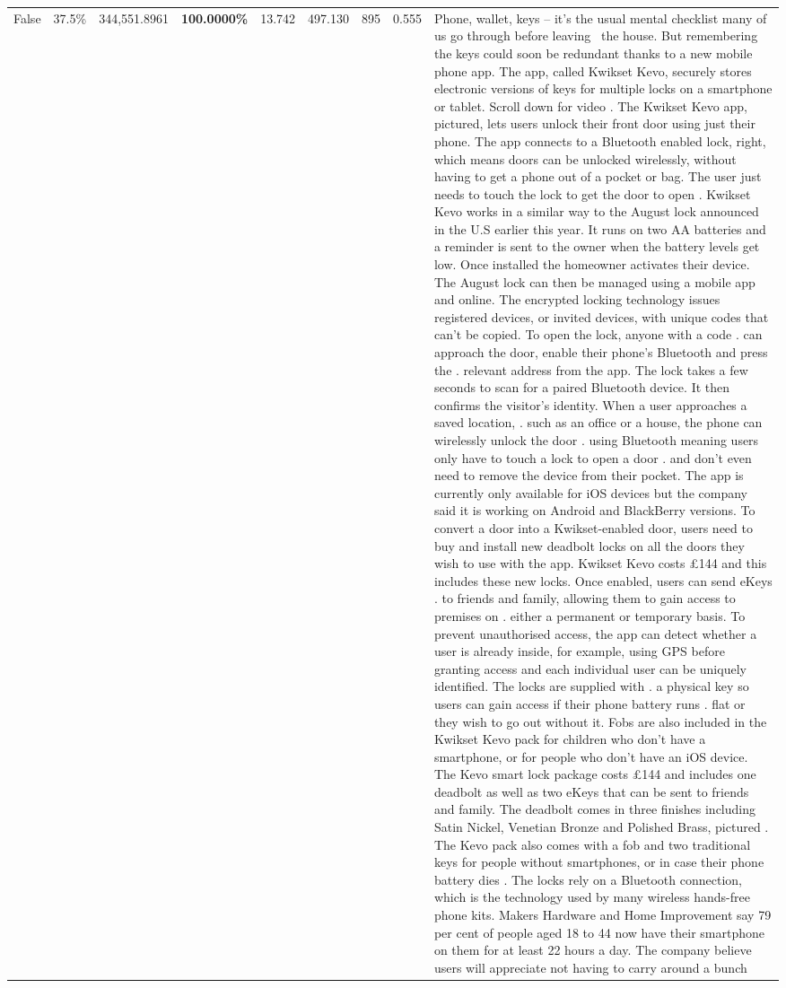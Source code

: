 \begin{table}[H]
\begin{tabular}{lllrlllll}
False & 37.5\% & 344,551.8961 & \bfseries \color{red} 100.0000\% & 13.742 & 497.130 & 895 & 0.555 & Phone, wallet, keys – it’s the usual mental checklist many of us go through before leaving  the house. But remembering the keys could soon be redundant thanks to a new mobile phone app. The app, called Kwikset Kevo, securely stores electronic versions of keys for multiple locks on a smartphone or tablet. Scroll down for video . The Kwikset Kevo app, pictured, lets users unlock their front door using just their phone. The app connects to a Bluetooth enabled lock, right, which means doors can be unlocked wirelessly, without having to get a phone out of a pocket or bag. The user just needs to touch the lock to get the door to open . Kwikset Kevo works in a similar way to the August lock announced in the U.S earlier this year. It runs on two AA batteries and a reminder is sent to the owner when the battery levels get low. Once installed the homeowner activates their device. The August lock can then be managed using a mobile app and online. The encrypted locking technology issues registered devices, or invited devices, with unique codes that can't be copied. To open the lock, anyone with a code . can approach the door, enable their phone's Bluetooth and press the . relevant address from the app. The lock takes a few seconds to scan for a paired Bluetooth device. It then confirms the visitor's identity. When a user approaches a saved location, . such as an office or a house, the phone can wirelessly unlock the door . using Bluetooth meaning users only have to touch a lock to open a door . and don't even need to remove the device from their pocket. The app is currently only available for iOS devices but the company said it is working on Android and BlackBerry versions. To convert a door into a Kwikset-enabled door, users need to buy and install new deadbolt locks on all the doors they wish to use with the app. Kwikset Kevo costs £144 and this includes these new locks. Once enabled, users can send eKeys . to friends and family, allowing them to gain access to premises on . either a permanent or temporary basis. To prevent unauthorised access, the app can detect whether a user is already inside, for example, using GPS before granting access and each individual user can be uniquely identified. The locks are supplied with . a physical key so users can gain access if their phone battery runs . flat or they wish to go out without it. Fobs are also included in the Kwikset Kevo pack for children who don't have a smartphone, or for people who don't have an iOS device. The Kevo smart lock package costs £144 and includes one deadbolt as well as two eKeys that can be sent to friends and family. The deadbolt comes in three finishes including Satin Nickel, Venetian Bronze and Polished Brass, pictured . The Kevo pack also comes with a fob and two traditional keys for people without smartphones, or in case their phone battery dies . The locks rely on a Bluetooth connection, which is the technology used by many wireless hands-free phone kits. Makers Hardware and Home Improvement say 79 per cent of people aged 18 to 44 now have their smartphone on them for at least 22 hours a day. The company believe users will appreciate not having to carry around a bunch 
\end{tabular}
\end{table}
